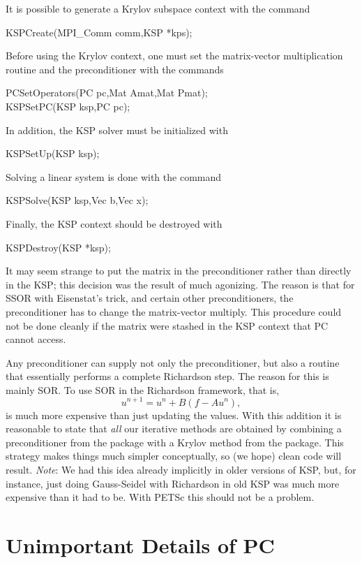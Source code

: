 {{It is possible to generate a Krylov subspace context with the
command
\begin{tabbing}
  KSPCreate(MPI\_Comm comm,KSP *kps);
\end{tabbing}
Before using the Krylov context, one must set the matrix-vector multiplication routine and
the preconditioner with the
commands
\begin{tabbing}
  PCSetOperators(PC pc,Mat Amat,Mat Pmat);\\
  KSPSetPC(KSP ksp,PC pc);
\end{tabbing}
In addition, the KSP solver must be initialized with
\begin{tabbing}
  KSPSetUp(KSP ksp);
\end{tabbing}
Solving a linear system is done with the command
\begin{tabbing}
  KSPSolve(KSP ksp,Vec b,Vec x);
\end{tabbing}
Finally, the KSP context should be destroyed with
\begin{tabbing}
  KSPDestroy(KSP *ksp);
\end{tabbing}

It may seem strange to put the matrix in the preconditioner rather
than directly in the KSP; this decision was the result of much
agonizing. The reason is that for SSOR with Eisenstat's trick, and
certain other preconditioners, the
preconditioner has to change the matrix-vector multiply.  This
procedure could not
be done cleanly if the matrix were stashed in the KSP context that
PC cannot access.

Any preconditioner can supply not
only the preconditioner, but also a routine that essentially performs a
complete Richardson step. The reason for this is mainly SOR. To
use SOR in the Richardson framework, that is,
\[
  u^{n+1} = u^{n} + B(f - A u^{n}),
\]
is much more expensive than just updating the values.
With this addition it is reasonable to state that {\em all} our
iterative methods are obtained by combining a preconditioner from
the  package with a Krylov method from the 
package. This strategy makes things much simpler conceptually, so
(we hope)
clean code will result. {\em Note}: We had this idea already implicitly in
older versions of KSP, but, for instance, just doing Gauss-Seidel
with Richardson in old KSP was much more expensive than it had to be.
With PETSc this should not be a problem.

\section{Unimportant Details of PC}

}}
